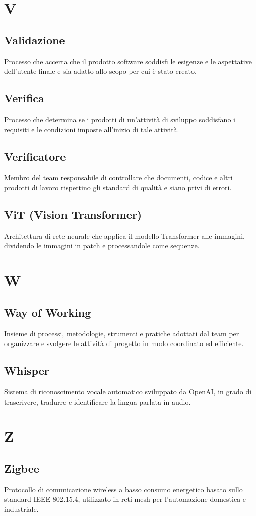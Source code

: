\documentclass[a4paper,11pt]{article}
\begin{document}
\newpage
\section{V}

\subsection{Validazione}
Processo che accerta che il prodotto software soddisfi le esigenze e le aspettative dell'utente finale e sia adatto allo scopo per cui è stato creato.

\subsection{Verifica}
Processo che determina se i prodotti di un'attività di sviluppo soddisfano i requisiti e le condizioni imposte all'inizio di tale attività.

\subsection{Verificatore}
Membro del team responsabile di controllare che documenti, codice e altri prodotti di lavoro rispettino gli standard di qualità e siano privi di errori.

\subsection{ViT (Vision Transformer)}
Architettura di rete neurale che applica il modello Transformer alle immagini, dividendo le immagini in patch e processandole come sequenze.

\newpage
\section{W}

\subsection{Way of Working}
Insieme di processi, metodologie, strumenti e pratiche adottati dal team per organizzare e svolgere le attività di progetto in modo coordinato ed efficiente.

\subsection{Whisper}
Sistema di riconoscimento vocale automatico sviluppato da OpenAI, in grado di trascrivere, tradurre e identificare la lingua parlata in audio.

\newpage
\section{Z}

\subsection{Zigbee}
Protocollo di comunicazione wireless a basso consumo energetico basato sullo standard IEEE 802.15.4, utilizzato in reti mesh per l'automazione domestica e industriale.
\end{document}
